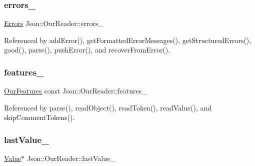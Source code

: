 \subsubsection{\texorpdfstring{errors\+\_\+}{errors\_}}
{\footnotesize\ttfamily \hyperlink{classJson_1_1OurReader_a8cc69593ef7303e58e99bb5dbb767562_a8cc69593ef7303e58e99bb5dbb767562}{Errors} Json\+::\+Our\+Reader\+::errors\+\_\+\hspace{0.3cm}{\ttfamily [private]}}



Referenced by add\+Error(), get\+Formatted\+Error\+Messages(), get\+Structured\+Errors(), good(), parse(), push\+Error(), and recover\+From\+Error().

\mbox{\label{classJson_1_1OurReader_a2714302d5cc54ca2ce4118ea51c0397a_a2714302d5cc54ca2ce4118ea51c0397a}} 
\subsubsection{\texorpdfstring{features\+\_\+}{features\_}}
{\footnotesize\ttfamily \hyperlink{classJson_1_1OurFeatures}{Our\+Features} const Json\+::\+Our\+Reader\+::features\+\_\+\hspace{0.3cm}{\ttfamily [private]}}



Referenced by parse(), read\+Object(), read\+Token(), read\+Value(), and skip\+Comment\+Tokens().

\mbox{\label{classJson_1_1OurReader_a9f994b6a2227c5d96e6ed6cbc74ed251_a9f994b6a2227c5d96e6ed6cbc74ed251}} 
\subsubsection{\texorpdfstring{last\+Value\+\_\+}{lastValue\_}}
{\footnotesize\ttfamily \hyperlink{classJson_1_1Value}{Value}$\ast$ Json\+::\+Our\+Reader\+::last\+Value\+\_\+\hspace{0.3cm}{\ttfamily [private]}}




